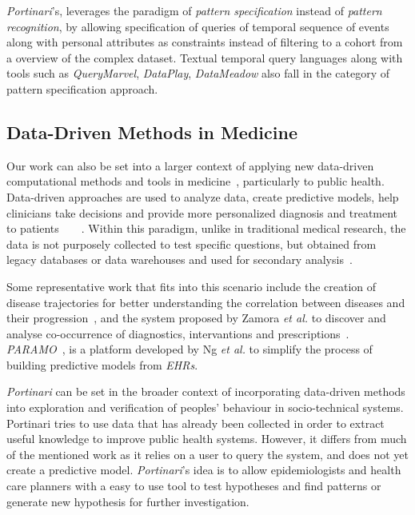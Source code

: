 \documentclass[10pt, conference]{IEEEtran}
\begin{document}
\textit{Portinari}'s, leverages the paradigm of \emph{pattern specification} instead of \textit{pattern recognition}, by allowing specification of queries of temporal sequence of events along with personal attributes as constraints instead of filtering to a cohort from a overview of the complex dataset. Textual temporal query languages along with tools such as \textit{QueryMarvel}, \textit{DataPlay}, \emph{DataMeadow} also fall in the category of pattern specification approach.

\subsection{Data-Driven Methods in Medicine}
Our work can also be set into a larger context of applying new data-driven computational methods and tools in  medicine~\cite{PredictiveDataMining}, particularly to public health. Data-driven approaches are used to analyze data, create predictive models, help clinicians  take decisions and provide more personalized diagnosis and treatment to patients~\cite{PredictiveDataMining}~\cite{BigDataHealthCare}~\cite{MiningHealthRecords}~\cite{BigDataHealthCare2}.
Within this paradigm, unlike in traditional medical research, the data is not purposely collected to test specific questions, but obtained from legacy databases or data warehouses and used for secondary analysis~\cite{PredictiveDataMining}. 

Some representative work that fits into this scenario include the creation of disease trajectories for better understanding the correlation between diseases and their progression~\cite{DiseaseTraject},  and the system proposed by Zamora \textit{et al.} to discover and analyse co-occurrence of diagnostics, intervantions and prescriptions~\cite{Polymedication}. \textit{PARAMO}~\cite{Paramo}, is a platform developed by Ng \textit{et al.} to simplify the process of building predictive models from \textit{EHRs}.

\textit{Portinari} can be set in the broader context of incorporating data-driven methods into exploration and verification of peoples' behaviour in socio-technical systems. Portinari tries to use data that has already been collected in order to extract useful knowledge to improve public health systems. However, it differs from much of the mentioned work as it relies on a user to query the system, and does not yet create a predictive model. \textit{Portinari}'s idea is to allow epidemiologists and health care planners with a easy to use tool to test  hypotheses and find patterns or generate new hypothesis for further investigation.
\end{document}
